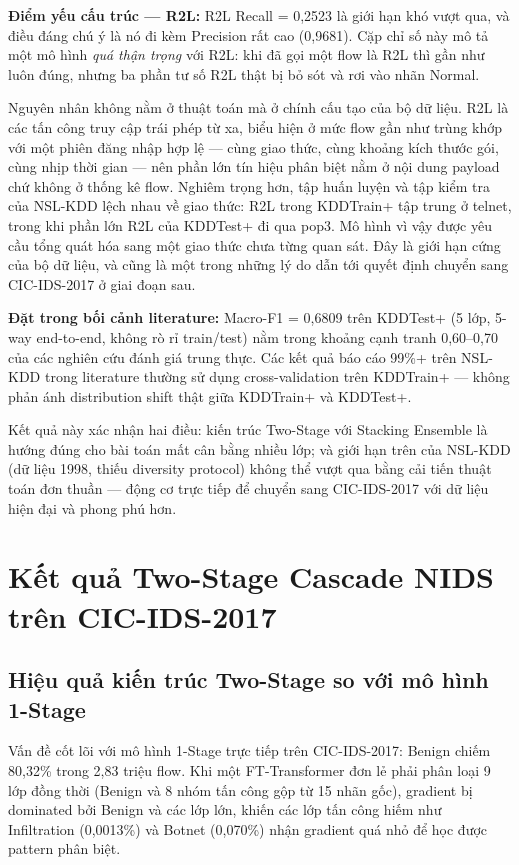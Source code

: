 \documentclass[../DoAn.tex]{subfiles}
\begin{document}
\textbf{Điểm yếu cấu trúc --- R2L:} R2L Recall = 0,2523 là giới hạn khó vượt qua, và điều đáng chú ý là nó đi kèm Precision rất cao (0,9681). Cặp chỉ số này mô tả một mô hình \textit{quá thận trọng} với R2L: khi đã gọi một flow là R2L thì gần như luôn đúng, nhưng ba phần tư số R2L thật bị bỏ sót và rơi vào nhãn Normal.

Nguyên nhân không nằm ở thuật toán mà ở chính cấu tạo của bộ dữ liệu. R2L là các tấn công truy cập trái phép từ xa, biểu hiện ở mức flow gần như trùng khớp với một phiên đăng nhập hợp lệ --- cùng giao thức, cùng khoảng kích thước gói, cùng nhịp thời gian --- nên phần lớn tín hiệu phân biệt nằm ở nội dung payload chứ không ở thống kê flow. Nghiêm trọng hơn, tập huấn luyện và tập kiểm tra của NSL-KDD lệch nhau về giao thức: R2L trong KDDTrain+ tập trung ở telnet, trong khi phần lớn R2L của KDDTest+ đi qua pop3. Mô hình vì vậy được yêu cầu tổng quát hóa sang một giao thức chưa từng quan sát. Đây là giới hạn cứng của bộ dữ liệu, và cũng là một trong những lý do dẫn tới quyết định chuyển sang CIC-IDS-2017 ở giai đoạn sau.

\textbf{Đặt trong bối cảnh literature:} Macro-F1 = 0,6809 trên KDDTest+ (5 lớp, 5-way end-to-end, không rò rỉ train/test) nằm trong khoảng cạnh tranh 0,60--0,70 của các nghiên cứu đánh giá trung thực. Các kết quả báo cáo 99\%+ trên NSL-KDD trong literature thường sử dụng cross-validation trên KDDTrain+ --- không phản ánh distribution shift thật giữa KDDTrain+ và KDDTest+.

Kết quả này xác nhận hai điều: kiến trúc Two-Stage với Stacking Ensemble là hướng đúng cho bài toán mất cân bằng nhiều lớp; và giới hạn trên của NSL-KDD (dữ liệu 1998, thiếu diversity protocol) không thể vượt qua bằng cải tiến thuật toán đơn thuần --- động cơ trực tiếp để chuyển sang CIC-IDS-2017 với dữ liệu hiện đại và phong phú hơn.

\section{Kết quả Two-Stage Cascade NIDS trên CIC-IDS-2017}
\label{sec:tn-cic}

\subsection{Hiệu quả kiến trúc Two-Stage so với mô hình 1-Stage}
\label{subsec:tn-cic-twostage}

Vấn đề cốt lõi với mô hình 1-Stage trực tiếp trên CIC-IDS-2017: Benign chiếm 80,32\% trong 2,83 triệu flow. Khi một FT-Transformer đơn lẻ phải phân loại 9 lớp đồng thời (Benign và 8 nhóm tấn công gộp từ 15 nhãn gốc), gradient bị dominated bởi Benign và các lớp lớn, khiến các lớp tấn công hiếm như Infiltration (0,0013\%) và Botnet (0,070\%) nhận gradient quá nhỏ để học được pattern phân biệt.
\end{document}
